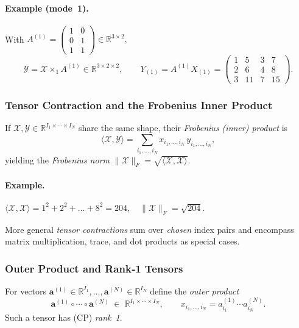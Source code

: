 \paragraph{Example (mode 1).}
With
\(
A^{(1)}=
\begin{pmatrix}1&0\\0&1\\1&1\end{pmatrix}\in\mathbb{R}^{3\times2},
\)
\[
\mathcal{Y}
=\mathcal{X}\times_1 A^{(1)}
\in\mathbb{R}^{\boxed{3}\times2\times2},
\qquad
Y_{(1)}=
A^{(1)}X_{(1)}=
\begin{pmatrix}
1&5&3&7\\
2&6&4&8\\
3&11&7&15
\end{pmatrix}.
\]

\subsubsection{Tensor Contraction and the Frobenius Inner Product}
If $\mathcal{X},\mathcal{Y}\in\mathbb{R}^{I_1\times\cdots\times I_N}$ share the same shape,
their \emph{Frobenius (inner) product} is
\[
  \langle\mathcal{X},\mathcal{Y}\rangle
  =\sum_{i_1,\dots,i_N}x_{i_1,\dots,i_N}\,y_{i_1,\dots,i_N},
\]
yielding the \emph{Frobenius norm}
$\|\mathcal{X}\|_F=\sqrt{\langle\mathcal{X},\mathcal{X}\rangle}$.

\paragraph{Example.}
$\displaystyle
\langle\mathcal{X},\mathcal{X}\rangle
=1^2+2^2+\dots+8^2
=204,
\quad
\|\mathcal{X}\|_F=\sqrt{204}.
$

More general \emph{tensor contractions} sum over \emph{chosen} index pairs and
encompass matrix multiplication, trace, and dot products as special cases.

\subsubsection{Outer Product and Rank‑1 Tensors}
For vectors
$\mathbf{a}^{(1)}\!\in\!\mathbb{R}^{I_1},\dots,
 \mathbf{a}^{(N)}\!\in\!\mathbb{R}^{I_N}$ define the \emph{outer product}
\[
  \mathbf{a}^{(1)}\circ\cdots\circ\mathbf{a}^{(N)}
  \;\in\;\mathbb{R}^{I_1\times\cdots\times I_N},
  \qquad
  x_{i_1,\dots,i_N}=a^{(1)}_{i_1}\!\cdots a^{(N)}_{i_N}.
\]
Such a tensor has (CP) \emph{rank 1}.

